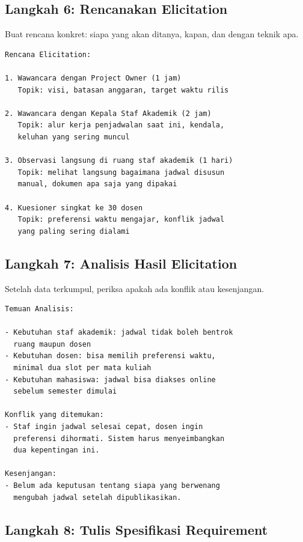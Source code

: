 \documentclass[11pt,a4paper]{article}
\begin{document}
\subsection{Langkah 6: Rencanakan Elicitation}

Buat rencana konkret: siapa yang akan ditanya, kapan, dan dengan teknik apa.

\begin{lstlisting}[style=out]
Rencana Elicitation:

1. Wawancara dengan Project Owner (1 jam)
   Topik: visi, batasan anggaran, target waktu rilis

2. Wawancara dengan Kepala Staf Akademik (2 jam)
   Topik: alur kerja penjadwalan saat ini, kendala,
   keluhan yang sering muncul

3. Observasi langsung di ruang staf akademik (1 hari)
   Topik: melihat langsung bagaimana jadwal disusun
   manual, dokumen apa saja yang dipakai

4. Kuesioner singkat ke 30 dosen
   Topik: preferensi waktu mengajar, konflik jadwal
   yang paling sering dialami
\end{lstlisting}

\subsection{Langkah 7: Analisis Hasil Elicitation}

Setelah data terkumpul, periksa apakah ada konflik atau kesenjangan.

\begin{lstlisting}[style=out]
Temuan Analisis:

- Kebutuhan staf akademik: jadwal tidak boleh bentrok
  ruang maupun dosen
- Kebutuhan dosen: bisa memilih preferensi waktu,
  minimal dua slot per mata kuliah
- Kebutuhan mahasiswa: jadwal bisa diakses online
  sebelum semester dimulai

Konflik yang ditemukan:
- Staf ingin jadwal selesai cepat, dosen ingin
  preferensi dihormati. Sistem harus menyeimbangkan
  dua kepentingan ini.

Kesenjangan:
- Belum ada keputusan tentang siapa yang berwenang
  mengubah jadwal setelah dipublikasikan.
\end{lstlisting}

\subsection{Langkah 8: Tulis Spesifikasi Requirement}
\end{document}
